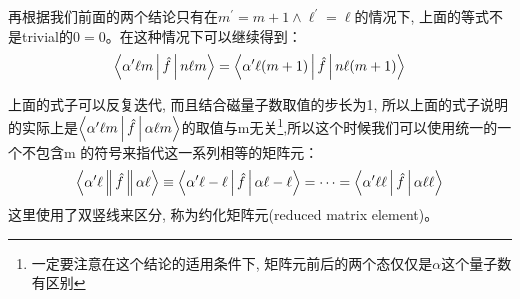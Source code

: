 \documentclass[a4paper,zihao=-4,linespread=1]{ctexrep}
\begin{document}
    再根据我们前面的两个结论只有在$m^\prime=m+1 \wedge \ell^\prime=\ell$的情况下, 上面的等式不是trivial的$0=0$。在这种情况下可以继续得到：
    \begin{equation}
        \Braket{\alpha^\prime\ell m|\hat{f}|n\ell m}=\Braket{\alpha^\prime\ell (m+1)|\hat{f}|n\ell (m+1)}
    \end{equation}
    
    上面的式子可以反复迭代, 而且结合磁量子数取值的步长为1, 所以上面的式子说明的实际上是$\Braket{\alpha^\prime \ell m|\hat{f}|\alpha\ell m}$的取值与m无关\footnote{一定要注意在这个结论的适用条件下, 矩阵元前后的两个态仅仅是$\alpha$这个量子数有区别},所以这个时候我们可以使用统一的一个不包含m 的符号来指代这一系列相等的矩阵元：
    \begin{equation}
        \label{eq:6.53}
        \Braket{\alpha^\prime \ell \|\hat{f}\|\alpha\ell }\equiv\Braket{\alpha^\prime \ell -\ell|\hat{f}|\alpha\ell -\ell}=\cdots=\Braket{\alpha^\prime \ell \ell|\hat{f}|\alpha\ell \ell}
    \end{equation}
    这里使用了双竖线来区分, 称为约化矩阵元(reduced matrix element)。
    
\end{document}

